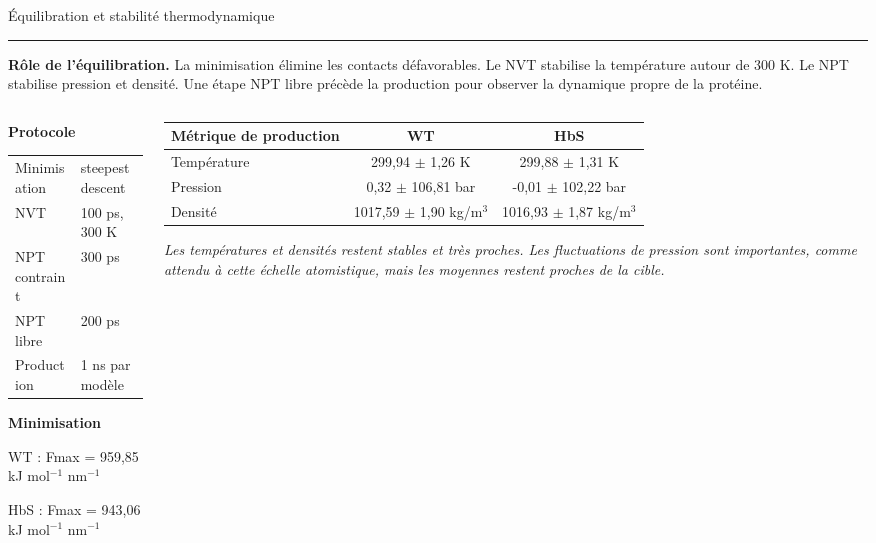 \documentclass[aspectratio=169,10pt]{beamer}
\newcommand{\slidetitleline}{\par\vspace{-0.3em}\noindent\textcolor{UniBlue}{\rule{\linewidth}{0.7pt}}\par\vspace{0.25em}}
\newcommand{\imgcaption}[1]{{\scriptsize\color{black!75}\textit{#1}}}
\begin{document}
\begin{frame}{Équilibration et stabilité thermodynamique}
\slidetitleline
\small
\textbf{Rôle de l'équilibration.} La minimisation élimine les contacts défavorables. Le NVT stabilise la température autour de 300 K. Le NPT stabilise pression et densité. Une étape NPT libre précède la production pour observer la dynamique propre de la protéine.

\vspace{0.5em}
\begin{columns}[T,totalwidth=\textwidth]
\begin{column}{0.41\textwidth}
\footnotesize
\textbf{Protocole}\par
\begin{tabular}{ll}
Minimisation & steepest descent \\
NVT & 100 ps, 300 K \\
NPT contraint & 300 ps \\
NPT libre & 200 ps \\
Production & 1 ns par modèle \\
\end{tabular}

\vspace{0.5em}
\textbf{Minimisation}\par
WT : Fmax = 959,85 kJ mol\(^{-1}\) nm\(^{-1}\)\par
HbS : Fmax = 943,06 kJ mol\(^{-1}\) nm\(^{-1}\)
\end{column}
\begin{column}{0.56\textwidth}
\centering
\scriptsize
\begin{tabular}{lcc}
\toprule
Métrique de production & WT & HbS \\
\midrule
Température & 299,94 \(\pm\) 1,26 K & 299,88 \(\pm\) 1,31 K \\
Pression & 0,32 \(\pm\) 106,81 bar & -0,01 \(\pm\) 102,22 bar \\
Densité & 1017,59 \(\pm\) 1,90 kg/m\(^3\) & 1016,93 \(\pm\) 1,87 kg/m\(^3\) \\
\bottomrule
\end{tabular}
\vspace{0.4em}

\imgcaption{Les températures et densités restent stables et très proches. Les fluctuations de pression sont importantes, comme attendu à cette échelle atomistique, mais les moyennes restent proches de la cible.}
\end{column}
\end{columns}
\end{frame}
\end{document}
